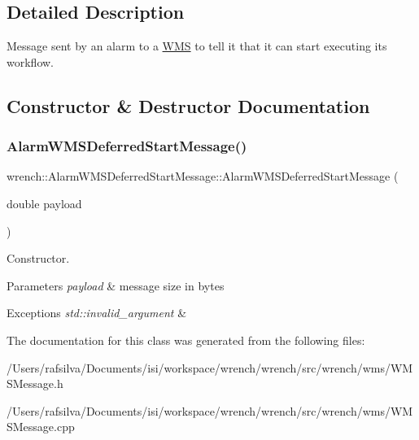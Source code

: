\subsection{Detailed Description}
Message sent by an alarm to a \hyperlink{classwrench_1_1_w_m_s}{W\+MS} to tell it that it can start executing its workflow. 

\subsection{Constructor \& Destructor Documentation}
\mbox{\label{classwrench_1_1_alarm_w_m_s_deferred_start_message_ade99acf79252141cb305cebc8f334d42}} 
\subsubsection{\texorpdfstring{Alarm\+W\+M\+S\+Deferred\+Start\+Message()}{AlarmWMSDeferredStartMessage()}}
{\footnotesize\ttfamily wrench\+::\+Alarm\+W\+M\+S\+Deferred\+Start\+Message\+::\+Alarm\+W\+M\+S\+Deferred\+Start\+Message (\begin{DoxyParamCaption}\item[{double}]{payload }\end{DoxyParamCaption})}



Constructor. 


\begin{DoxyParams}{Parameters}
{\em payload} & message size in bytes\\
\hline
\end{DoxyParams}

\begin{DoxyExceptions}{Exceptions}
{\em std\+::invalid\+\_\+argument} & \\
\hline
\end{DoxyExceptions}


The documentation for this class was generated from the following files\+:\begin{DoxyCompactItemize}
\item 
/\+Users/rafsilva/\+Documents/isi/workspace/wrench/wrench/src/wrench/wms/W\+M\+S\+Message.\+h\item 
/\+Users/rafsilva/\+Documents/isi/workspace/wrench/wrench/src/wrench/wms/W\+M\+S\+Message.\+cpp\end{DoxyCompactItemize}
